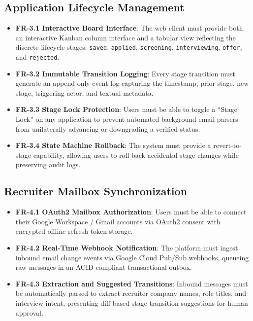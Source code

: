 \subsection{Application Lifecycle Management}
\begin{itemize}
    \item \textbf{FR-3.1 Interactive Board Interface}: The web client must provide both an interactive Kanban column interface and a tabular view reflecting the discrete lifecycle stages: \texttt{saved}, \texttt{applied}, \texttt{screening}, \texttt{interviewing}, \texttt{offer}, and \texttt{rejected}.
    \item \textbf{FR-3.2 Immutable Transition Logging}: Every stage transition must generate an append-only event log capturing the timestamp, prior stage, new stage, triggering actor, and textual metadata.
    \item \textbf{FR-3.3 Stage Lock Protection}: Users must be able to toggle a ``Stage Lock'' on any application to prevent automated background email parsers from unilaterally advancing or downgrading a verified status.
    \item \textbf{FR-3.4 State Machine Rollback}: The system must provide a revert-to-stage capability, allowing users to roll back accidental stage changes while preserving audit logs.
\end{itemize}

\subsection{Recruiter Mailbox Synchronization}
\begin{itemize}
    \item \textbf{FR-4.1 OAuth2 Mailbox Authorization}: Users must be able to connect their Google Workspace / Gmail accounts via OAuth2 consent with encrypted offline refresh token storage.
    \item \textbf{FR-4.2 Real-Time Webhook Notification}: The platform must ingest inbound email change events via Google Cloud Pub/Sub webhooks, queueing raw messages in an ACID-compliant transactional outbox.
    \item \textbf{FR-4.3 Extraction and Suggested Transitions}: Inbound messages must be automatically parsed to extract recruiter company names, role titles, and interview intent, presenting diff-based stage transition suggestions for human approval.
\end{itemize}

